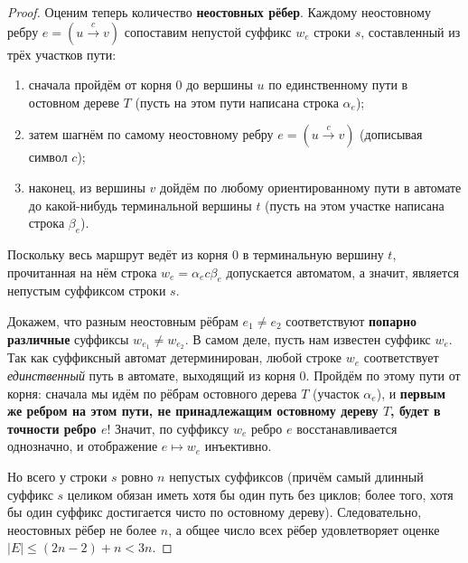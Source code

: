 \begin{proof}
    Оценим теперь количество \textbf{неостовных рёбер}. Каждому неостовному ребру $e = (u \xrightarrow{c} v)$ сопоставим непустой суффикс $w_e$ строки $s$, составленный из трёх участков пути:
    \begin{enumerate}
        \item сначала пройдём от корня $0$ до вершины $u$ по единственному пути в остовном дереве $T$ (пусть на этом пути написана строка $\alpha_e$);
        \item затем шагнём по самому неостовному ребру $e = (u \xrightarrow{c} v)$ (дописывая символ $c$);
        \item наконец, из вершины $v$ дойдём по любому ориентированному пути в автомате до какой-нибудь терминальной вершины $t$ (пусть на этом участке написана строка $\beta_e$).
    \end{enumerate}
    Поскольку весь маршрут ведёт из корня $0$ в терминальную вершину $t$, прочитанная на нём строка $w_e = \alpha_e c \beta_e$ допускается автоматом, а значит, является непустым суффиксом строки $s$.

    Докажем, что разным неостовным рёбрам $e_1 \ne e_2$ соответствуют \textbf{попарно различные} суффиксы $w_{e_1} \ne w_{e_2}$. В самом деле, пусть нам известен суффикс $w_e$. Так как суффиксный автомат детерминирован, любой строке $w_e$ соответствует \emph{единственный} путь в автомате, выходящий из корня $0$. Пройдём по этому пути от корня: сначала мы идём по рёбрам остовного дерева $T$ (участок $\alpha_e$), и \textbf{первым же ребром на этом пути, не принадлежащим остовному дереву $T$, будет в точности ребро $e$}! Значит, по суффиксу $w_e$ ребро $e$ восстанавливается однозначно, и отображение $e \mapsto w_e$ инъективно.

    Но всего у строки $s$ ровно $n$ непустых суффиксов (причём самый длинный суффикс $s$ целиком обязан иметь хотя бы один путь без циклов; более того, хотя бы один суффикс достигается чисто по остовному дереву). Следовательно, неостовных рёбер не более $n$, а общее число всех рёбер удовлетворяет оценке $|E| \le (2n - 2) + n < 3n$.
\end{proof}
